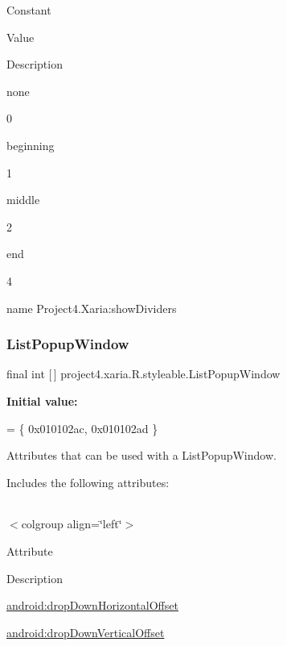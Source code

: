 Constant

Value

Description 

{\ttfamily none}

0

{\ttfamily beginning}

1

{\ttfamily middle}

2

{\ttfamily end}

4

name Project4.\+Xaria\+:show\+Dividers \mbox{\label{classproject4_1_1xaria_1_1R_1_1styleable_a648f834c188005b618d26a2407391de2}} 
\subsubsection{\texorpdfstring{List\+Popup\+Window}{ListPopupWindow}}
{\footnotesize\ttfamily final int \mbox{[}$\,$\mbox{]} project4.\+xaria.\+R.\+styleable.\+List\+Popup\+Window\hspace{0.3cm}{\ttfamily [static]}}

{\bfseries Initial value\+:}
\begin{DoxyCode}
= \{
            0x010102ac, 0x010102ad
        \}
\end{DoxyCode}
Attributes that can be used with a List\+Popup\+Window. 

Includes the following attributes\+:

\tabulinesep=1mm
\begin{longtabu} spread 0pt [c]{*{0}{|X[-1]}|}
\hline
\end{longtabu}
$<$colgroup align=\char`\"{}left\char`\"{}$>$ 

Attribute

Description 

{\ttfamily \hyperlink{classproject4_1_1xaria_1_1R_1_1styleable_a8004d07b04c30d96817792efd7c20247}{android\+:drop\+Down\+Horizontal\+Offset}}

{\ttfamily \hyperlink{classproject4_1_1xaria_1_1R_1_1styleable_a4d028c17c849372c3e3ced8a7e62a8ce}{android\+:drop\+Down\+Vertical\+Offset}}

